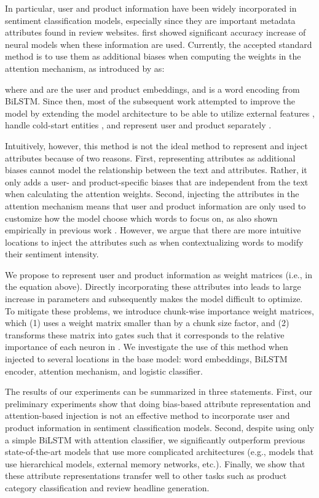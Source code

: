 \documentclass[11pt,a4paper]{article}
\begin{document}
In particular, user and product information have been widely incorporated in sentiment classification models, especially since they are important metadata attributes found in review websites. \citet{tang2015learning} first showed significant accuracy increase of neural models when these information are used. Currently, the accepted standard method is to use them as additional biases when computing the weights  in the attention mechanism, as introduced by \citet{chen2016neural} as:

where  and  are the user and product embeddings, and  is a word encoding from BiLSTM. Since then, most of the subsequent work attempted to improve the model by extending the model architecture to be able to utilize external features \cite{zhu2017parallel}, handle cold-start entities \cite{amplayo2018cold}, and represent user and product separately \cite{ma2017cascading}.

Intuitively, however, this method is not the ideal method to represent and inject attributes because of two reasons.
First, representing attributes as additional biases cannot model the relationship between the text and attributes. Rather, it only adds a user- and product-specific biases that are independent from the text when calculating the attention weights.
Second, injecting the attributes in the attention mechanism means that user and product information are only used to customize how the model choose which words to focus on, as also shown empirically in previous work \cite{chen2016neural,ma2017cascading}. However, we argue that there are more intuitive locations to inject the attributes such as when contextualizing words to modify their sentiment intensity.

We propose to represent user and product information as weight matrices (i.e.,  in the equation above). Directly incorporating these attributes into  leads to large increase in parameters and subsequently makes the model difficult to optimize. To mitigate these problems, we introduce chunk-wise importance weight matrices, which (1) uses a weight matrix smaller than  by a chunk size factor, and (2) transforms these matrix into gates such that it corresponds to the relative importance of each neuron in . We investigate the use of this method when injected to several locations in the base model: word embeddings, BiLSTM encoder, attention mechanism, and logistic classifier.

The results of our experiments can be summarized in three statements. First, our preliminary experiments show that doing bias-based attribute representation and attention-based injection is not an effective method to incorporate user and product information in sentiment classification models. Second, despite using only a simple BiLSTM with attention classifier, we significantly outperform previous state-of-the-art models that use more complicated architectures (e.g., models that use hierarchical models, external memory networks, etc.). Finally, we show that these attribute representations transfer well to other tasks such as product category classification and review headline generation.
\end{document}
